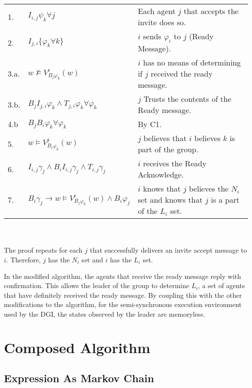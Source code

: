 \begin{table}[h!]
\centering
\small
\begin{tabularx}{\linewidth}{l X X}
1. & $I_{i,j} \psi_k \forall j $ & Each agent $j$ that accepts the invite does so.  \\
2. & $I_{j,i} \{ \varphi_k \forall k \}$ & $i$ sends $\varphi_i$ to $j$ (Ready Message). \\
3.a. & $w \not \vDash V_{B_j \varphi_k}^i(w) $ & $i$ has no means of determining if $j$ received the ready message. \\
3.b. & $B_{j}I_{j,i} \varphi_k \wedge T_{j,i} \varphi_k \forall \varphi_k$ & $j$ Trusts the contents of the Ready message. \\
4.b & $B_j B_i \varphi_k \forall \varphi_k$ & By C1. \\
5. & $w \vDash V_{B_i \varphi_k}^j(w)$ & $j$ believes that $i$ believes $k$ is part of the group. \\
6. & $I_{i,j} \gamma_j \wedge B_i I_{i,j} \gamma_j \wedge T_{i,j} \gamma_j$ & $i$ receives the Ready Acknowledge. \\
7. & $B_i \gamma_j \rightarrow w \vDash V_{B_j \varphi_k}^{i}(w) \wedge B_i \varphi_j$ & $i$ knows that $j$ believes the $N_i$ set and knows that $j$ is a part of the $L_i$ set. \\
\end{tabularx} \\~\\
The proof repeats for each $j$ that successfully delivers an invite accept message to $i$. Therefore, $j$ has the $N_i$ set and $i$ has the $L_i$ set.
\label{tab:readylnsetproof}
\end{table}

In the modified algorithm, the agents that receive the ready message reply with confirmation. This allows the leader of the group to determine $L_i$, a set of agents that have definitely received the ready message. By coupling this with the other modifications to the algorithm, for the semi-synchronous execution environment used by the \ac{DGI}, the states observed by the leader are memoryless.

\section{Composed Algorithm}

\subsection{Expression As Markov Chain}

